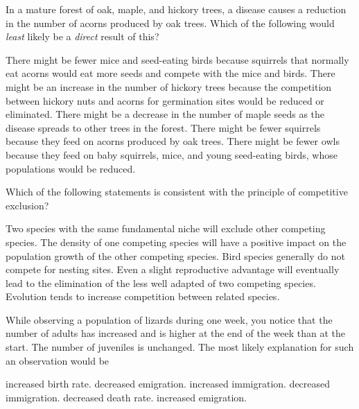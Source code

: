\newpage

\question
In a mature forest of oak, maple, and hickory trees, a disease causes a reduction in the number of acorns produced by oak trees. Which of the following would \emph{least} likely be a \emph{direct} result of this? 

\begin{choices}
\choice  There might be fewer mice and seed-eating birds because squirrels that normally eat acorns would eat more seeds and compete with the mice and birds.
\choice There might be an increase in the number of hickory trees because the competition between hickory nuts and acorns for germination sites would be reduced or eliminated. 
\correctchoice There might be a decrease in the number of maple seeds as the disease spreads to other trees in the forest. 
\choice There might be fewer squirrels because they feed on acorns produced by oak trees. 
\choice There might be fewer owls because they feed on baby squirrels, mice, and young seed-eating birds, whose populations would be reduced. 
\end{choices}

\question
Which of the following statements is consistent with the principle of competitive exclusion?  

\begin{choices}
\choice Two species with the same fundamental niche will exclude other competing species.   
\choice The density of one competing species will have a positive impact on the population growth of the other competing species. 
\choice Bird species generally do not compete for nesting sites.  
\correctchoice Even a slight reproductive advantage will eventually lead to the elimination of the less well adapted of two competing species. 
\choice Evolution tends to increase competition between related species.   
\end{choices}

\question
While observing a population of lizards during one week, you notice that the number of adults has increased and is higher at the end of the week than at the start. The number of juveniles is unchanged. The most likely explanation for such an observation would be 

\begin{choices}
\choice increased birth rate.  
\choice decreased emigration.  
\correctchoice increased immigration.  
\choice decreased immigration. 
\choice decreased death rate. 
\choice increased emigration.  
\end{choices}


